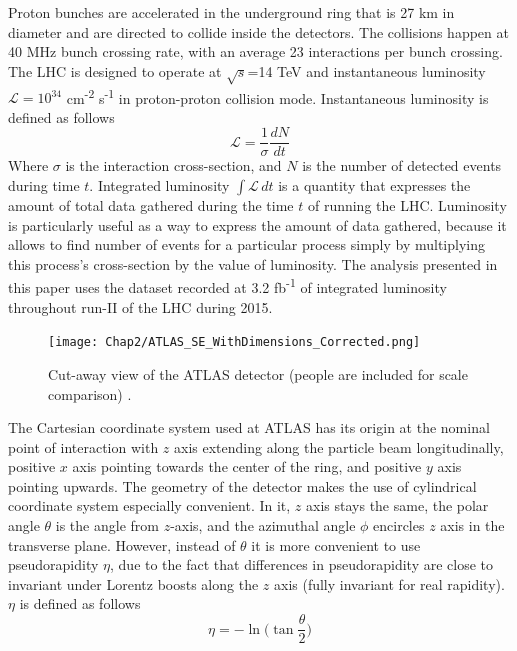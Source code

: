 Proton bunches are accelerated in the underground ring that is 27 km in diameter and are directed to collide inside the detectors. The collisions happen at 40 MHz bunch crossing rate, with an average 23 interactions per bunch crossing. The LHC is designed to operate at $\sqrt{s}$=14 TeV and instantaneous luminosity $\mathcal{L} = 10^{34}$ cm\textsuperscript{-2} s\textsuperscript{-1} in proton-proton collision mode. Instantaneous luminosity is defined as follows
\begin{equation}
\mathcal{L} = \frac{1}{\sigma}\frac{dN}{dt}
\end{equation}  
Where $\sigma$ is the interaction cross-section, and $N$ is the number of detected events during time $t$. Integrated luminosity $\int \mathcal{L}\, dt$ is a quantity that expresses the amount of total data gathered during the time $t$ of running the LHC. Luminosity  is particularly useful as a way to express the amount of data gathered, because it allows to find number of events for a particular process simply by multiplying this process's cross-section by the value of luminosity. The analysis presented in this paper uses the dataset recorded at 3.2 fb\textsuperscript{-1} of integrated luminosity throughout run-II of the LHC during 2015. 


\begin{figure}[!t]
	\centering
    \captionsetup{width=\textwidth}
	\texttt{[image: Chap2/ATLAS\_SE\_WithDimensions\_Corrected.png]}
\caption[Cut-away view of the ATLAS detector]{\label{fig:detector}  Cut-away view of the ATLAS detector (people are included for scale comparison) \citep{aad2008atlas}. }
\end{figure}

The Cartesian coordinate system used at ATLAS has its origin at the nominal point of interaction with $z$ axis extending along the particle beam longitudinally, positive $x$ axis pointing towards the center of the ring, and positive $y$ axis pointing upwards. 
The geometry of the detector makes the use of cylindrical coordinate system especially convenient. In it, $z$ axis stays the same, the polar angle $\theta$ is the angle from $z$-axis, and the azimuthal angle $\phi$ encircles $z$ axis in the transverse plane. However, instead of $\theta$ it is more convenient to use pseudorapidity $\eta$, due to the fact that differences in pseudorapidity are close to invariant under Lorentz boosts along the $z$ axis (fully invariant for real rapidity). $\eta$ is defined as follows
\begin{equation}
\eta = -\ln\biggl(\tan\frac{\theta}{2}\biggr)
\end{equation}


